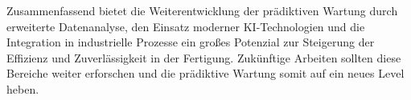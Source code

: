 Zusammenfassend bietet die Weiterentwicklung der prädiktiven Wartung durch erweiterte Datenanalyse, den Einsatz moderner KI-Technologien und die Integration in industrielle Prozesse ein großes Potenzial zur Steigerung der Effizienz und Zuverlässigkeit in der Fertigung. Zukünftige Arbeiten sollten diese Bereiche weiter erforschen und die prädiktive Wartung somit auf ein neues Level heben.


\endinput
